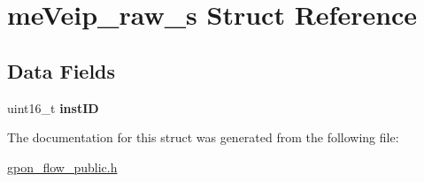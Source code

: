 \hypertarget{structmeVeip__raw__s}{}\section{me\+Veip\+\_\+raw\+\_\+s Struct Reference}
\label{structmeVeip__raw__s}
\subsection*{Data Fields}
\begin{DoxyCompactItemize}
\item 
\mbox{\label{structmeVeip__raw__s_a3e14fef8788c0973be9e8d42d3c545d7}} 
uint16\+\_\+t {\bfseries inst\+ID}
\end{DoxyCompactItemize}


The documentation for this struct was generated from the following file\+:\begin{DoxyCompactItemize}
\item 
\hyperlink{gpon__flow__public_8h}{gpon\+\_\+flow\+\_\+public.\+h}\end{DoxyCompactItemize}
